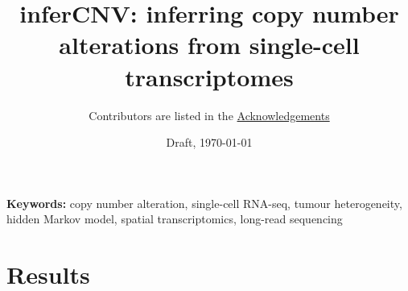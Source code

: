 \documentclass[11pt]{article}
\title{inferCNV: inferring copy number alterations from single-cell transcriptomes}
\author{\normalsize Contributors are listed in the \hyperref[sec:acknowledgements]{Acknowledgements}}
\date{Draft, \today}
\begin{document}
\maketitle

\begin{abstract}

\end{abstract}

\noindent\textbf{Keywords:} copy number alteration, single-cell RNA-seq, tumour heterogeneity, hidden Markov model, spatial transcriptomics, long-read sequencing

\section{Results}\label{sec:results}













\end{document}
